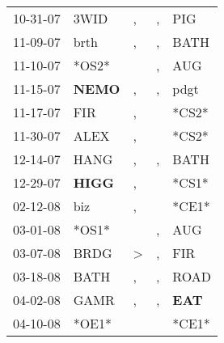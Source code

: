 \begin{supertabular}{p{0.07\textwidth}p{0.06\textwidth}p{0.02\textwidth}p{0.02\textwidth}p{0.06\textwidth}}
          10-31-07\textsuperscript{} &           3WID\textsuperscript{} &                , &                , &            PIG\textsuperscript{} \\
          11-09-07\textsuperscript{} &           brth\textsuperscript{} &                , &                , &           BATH\textsuperscript{} \\
          11-10-07\textsuperscript{} &                            *OS2* &                  &                , &            AUG\textsuperscript{} \\
          11-15-07\textsuperscript{} &  \textbf{NEMO\textsuperscript{}} &                , &                , &           pdgt\textsuperscript{} \\
          11-17-07\textsuperscript{} &            FIR\textsuperscript{} &                , &                  &                            *CS2* \\
          11-30-07\textsuperscript{} &           ALEX\textsuperscript{} &                , &                  &                            *CS2* \\
          12-14-07\textsuperscript{} &           HANG\textsuperscript{} &                , &                , &           BATH\textsuperscript{} \\
          12-29-07\textsuperscript{} &  \textbf{HIGG\textsuperscript{}} &                , &                  &                            *CS1* \\
          02-12-08\textsuperscript{} &            biz\textsuperscript{} &                , &                  &                            *CE1* \\
          03-01-08\textsuperscript{} &                            *OS1* &                  &                , &            AUG\textsuperscript{} \\
          03-07-08\textsuperscript{} &           BRDG\textsuperscript{} &     \textgreater &                , &            FIR\textsuperscript{} \\
          03-18-08\textsuperscript{} &           BATH\textsuperscript{} &                , &                , &           ROAD\textsuperscript{} \\
          04-02-08\textsuperscript{} &           GAMR\textsuperscript{} &                , &                , &   \textbf{EAT\textsuperscript{}} \\
          04-10-08\textsuperscript{} &                            *OE1* &                  &                  &                            *CE1* \\

\end{supertabular}
